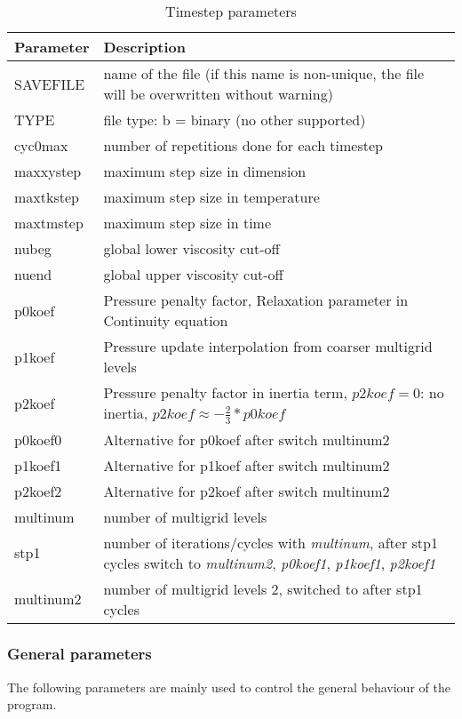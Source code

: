 \begin{table}[H]
\small
\centering
\begin{tabular}{l p{13cm}}
\toprule
Parameter & Description \\
\midrule
SAVEFILE & name of the file (if this name is non-unique, the file will be overwritten without warning) \\
TYPE & file type: b = binary (no other supported) \\
cyc0max & number of repetitions done for each timestep \\
maxxystep & maximum step size in dimension \\
maxtkstep & maximum step size in temperature \\
maxtmstep & maximum step size in time \\
nubeg & global lower viscosity cut-off \\
nuend & global upper viscosity cut-off \\
p0koef & Pressure penalty factor, Relaxation parameter in Continuity equation \\
p1koef & Pressure update interpolation from coarser multigrid levels \\
p2koef & Pressure penalty factor in inertia term, $p2koef=0$: no inertia, $p2koef\approx-\frac{2}{3}*p0koef$\\
p0koef0 & Alternative for p0koef after switch multinum2\\
p1koef1 & Alternative for p1koef after switch multinum2\\
p2koef2 & Alternative for p2koef after switch multinum2\\
multinum &  number of multigrid levels \\
stp1 & number of iterations/cycles with \textit{multinum}, after stp1 cycles switch to \textit{multinum2}, \textit{p0koef1}, \textit{p1koef1}, \textit{p2koef1}\\
multinum2 & number of multigrid levels 2, switched to after stp1 cycles\\
\bottomrule
\end{tabular}
\caption{Timestep parameters}
\label{tbl:timestep_parameters}
\end{table}

\subsubsection{General parameters}
The following parameters are mainly used to control the general behaviour of the program.


